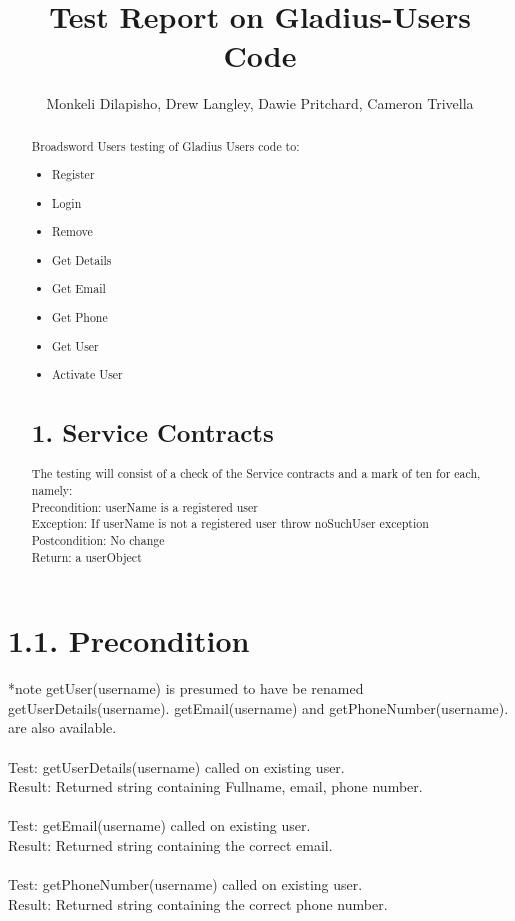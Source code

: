\documentclass[]{report}
\title{Test Report on Gladius-Users Code}
\author{Monkeli Dilapisho, Drew Langley, Dawie Pritchard, Cameron Trivella}
\begin{document}
	\maketitle
	
	\begin{abstract}
		Broadsword Users testing of Gladius Users code to:
		\begin{itemize}
			\item Register
			\item Login
			\item Remove
			\item Get Details
			\item Get Email
			\item Get Phone 
			\item Get User
			\item Activate User
		\end{itemize}	
		
	\section*{1. Service Contracts}	
		\noindent The testing will consist of a check of the Service contracts and a mark of ten for each, namely:\\
		 	\indent Precondition: userName is a registered user\\ 
		 	\indent Exception: If userName is not a registered user throw noSuchUser exception \\
		 	\indent Postcondition: No change \\
		 	\indent Return: a userObject	\\
				
	\end{abstract}

	\section*{1.1. Precondition}
		*note getUser(username) is presumed to have be renamed getUserDetails(username). getEmail(username) and getPhoneNumber(username). are also available.\\ \\
		
		\noindent Test: getUserDetails(username) called on existing user.\\
		Result: Returned string containing Fullname, email, phone number.\\ \\
		Test: getEmail(username) called on existing user.\\
		Result: Returned string containing the correct email.\\\\
		Test: getPhoneNumber(username) called on existing user.\\
		Result: Returned string containing the correct phone number.\\
		
\end{document}
